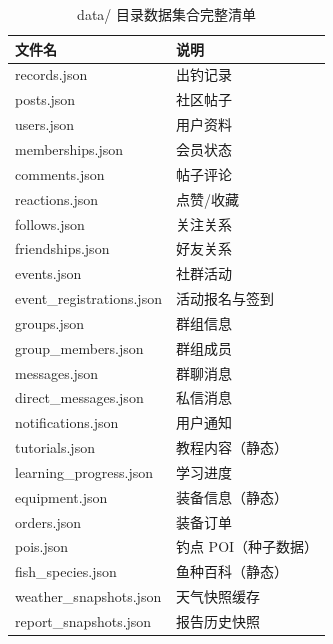 \documentclass[12pt,a4paper]{ctexart}
\begin{document}
\begin{table}[H]
  \centering
  \caption{data/ 目录数据集合完整清单}
  \label{tab:all-collections}
  \begin{tabular}{p{4cm}p{8cm}}
    \toprule
    \textbf{文件名} & \textbf{说明} \\
    \midrule
    records.json & 出钓记录 \\
    posts.json & 社区帖子 \\
    users.json & 用户资料 \\
    memberships.json & 会员状态 \\
    comments.json & 帖子评论 \\
    reactions.json & 点赞/收藏 \\
    follows.json & 关注关系 \\
    friendships.json & 好友关系 \\
    events.json & 社群活动 \\
    event\_registrations.json & 活动报名与签到 \\
    groups.json & 群组信息 \\
    group\_members.json & 群组成员 \\
    messages.json & 群聊消息 \\
    direct\_messages.json & 私信消息 \\
    notifications.json & 用户通知 \\
    tutorials.json & 教程内容（静态） \\
    learning\_progress.json & 学习进度 \\
    equipment.json & 装备信息（静态） \\
    orders.json & 装备订单 \\
    pois.json & 钓点 POI（种子数据） \\
    fish\_species.json & 鱼种百科（静态） \\
    weather\_snapshots.json & 天气快照缓存 \\
    report\_snapshots.json & 报告历史快照 \\
    \bottomrule
  \end{tabular}
\end{table}
\end{document}
